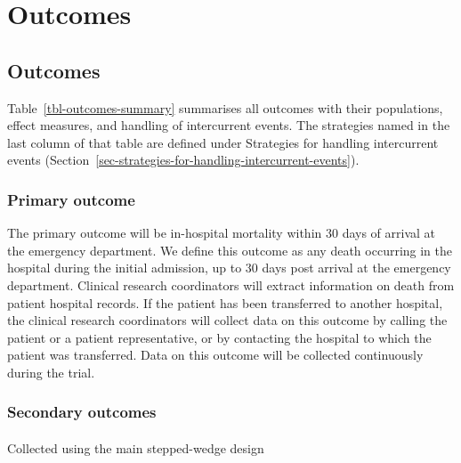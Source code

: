 \documentclass[
]{scrartcl}
\makeatletter
\let\oldparagraph\paragraph
\renewcommand{\paragraph}{
    \@ifstar
      \xxxParagraphStar
      \xxxParagraphNoStar
  }
\newcommand{\xxxParagraphStar}[1]{\oldparagraph*{#1}\mbox{}}
\newcommand{\xxxParagraphNoStar}[1]{\oldparagraph{#1}\mbox{}}
\makeatother
\begin{document}
\section{Outcomes}\label{sec-outcomes}

\subsection{Outcomes}\label{sec-outcomes-overview}

Table~\ref{tbl-outcomes-summary} summarises all outcomes with their
populations, effect measures, and handling of intercurrent events. The
strategies named in the last column of that table are defined under
Strategies for handling intercurrent events
(Section~\ref{sec-strategies-for-handling-intercurrent-events}).

\subsubsection{Primary outcome}\label{primary-outcome}

The primary outcome will be in-hospital mortality within 30 days of
arrival at the emergency department. We define this outcome as any death
occurring in the hospital during the initial admission, up to 30 days
post arrival at the emergency department. Clinical research coordinators
will extract information on death from patient hospital records. If the
patient has been transferred to another hospital, the clinical research
coordinators will collect data on this outcome by calling the patient or
a patient representative, or by contacting the hospital to which the
patient was transferred. Data on this outcome will be collected
continuously during the trial.

\subsubsection{Secondary outcomes}\label{secondary-outcomes}

\paragraph{Collected using the main stepped-wedge
design}\label{collected-using-the-main-stepped-wedge-design}
\end{document}
